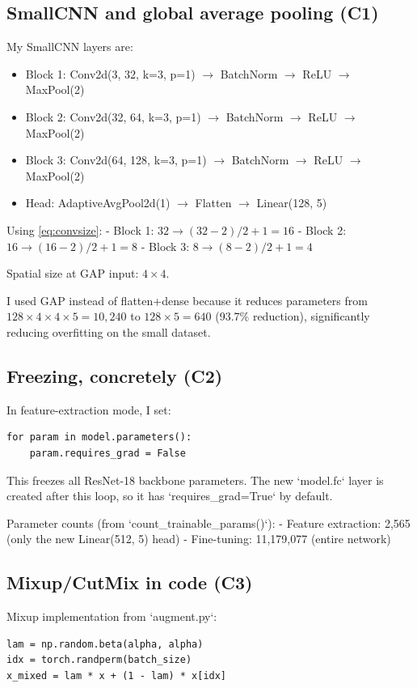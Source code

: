 \documentclass[10pt,twocolumn,letterpaper]{article}
\begin{document}
\subsection{SmallCNN and global average pooling (C1)}

My SmallCNN layers are:
\begin{itemize}
\item Block 1: Conv2d(3, 32, k=3, p=1) $\to$ BatchNorm $\to$ ReLU $\to$ MaxPool(2)
\item Block 2: Conv2d(32, 64, k=3, p=1) $\to$ BatchNorm $\to$ ReLU $\to$ MaxPool(2)
\item Block 3: Conv2d(64, 128, k=3, p=1) $\to$ BatchNorm $\to$ ReLU $\to$ MaxPool(2)
\item Head: AdaptiveAvgPool2d(1) $\to$ Flatten $\to$ Linear(128, 5)
\end{itemize}

Using \eqref{eq:convsize}:
- Block 1: $32 \to (32-2)/2 + 1 = 16$
- Block 2: $16 \to (16-2)/2 + 1 = 8$
- Block 3: $8 \to (8-2)/2 + 1 = 4$

Spatial size at GAP input: $4 \times 4$.

I used GAP instead of flatten+dense because it reduces parameters from
$128 \times 4 \times 4 \times 5 = 10,240$ to $128 \times 5 = 640$ (93.7\%
reduction), significantly reducing overfitting on the small dataset.

\subsection{Freezing, concretely (C2)}

In feature-extraction mode, I set:
\begin{lstlisting}
for param in model.parameters():
    param.requires_grad = False
\end{lstlisting}
This freezes all ResNet-18 backbone parameters. The new `model.fc` layer is
created after this loop, so it has `requires\_grad=True` by default.

Parameter counts (from `count\_trainable\_params()`):
- Feature extraction: 2,565 (only the new Linear(512, 5) head)
- Fine-tuning: 11,179,077 (entire network)

\subsection{Mixup/CutMix in code (C3)}

Mixup implementation from `augment.py`:
\begin{lstlisting}
lam = np.random.beta(alpha, alpha)
idx = torch.randperm(batch_size)
x_mixed = lam * x + (1 - lam) * x[idx]
\end{lstlisting}
\end{document}
